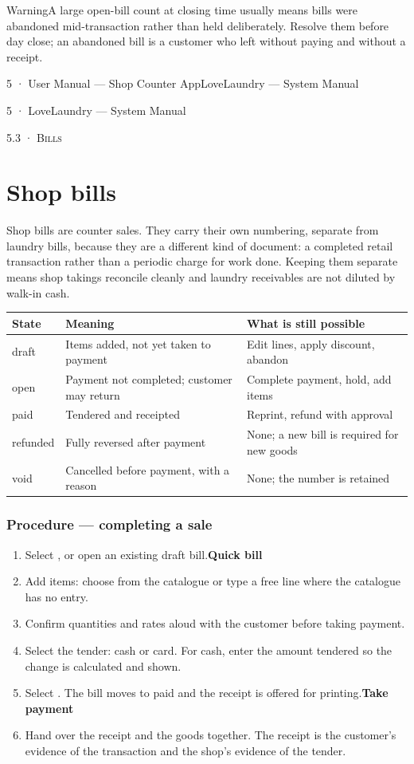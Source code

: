 \documentclass[11pt,a4paper,oneside]{book}
\begin{document}
\begin{notebox}WarningA large open-bill count at closing time usually means bills were abandoned mid-transaction rather than held deliberately. Resolve them before day close; an abandoned bill is a customer who left without paying and without a receipt.\end{notebox}
5 · User Manual — Shop Counter AppLoveLaundry — System Manual

5 · LoveLaundry — System Manual

\textsc{\small\color{crimson}5.3 · Bills}\par\medskip
\section*{Shop bills}
Shop bills are counter sales. They carry their own numbering, separate from laundry bills, because they are a different kind of document: a completed retail transaction rather than a periodic charge for work done. Keeping them separate means shop takings reconcile cleanly and laundry receivables are not diluted by walk-in cash.

\begin{center}\small
\begin{tabularx}{\linewidth}{|X|X|X|}
\hline
\rowcolor{lightgrey}
\textbf{State} & \textbf{Meaning} & \textbf{What is still possible} \\ \hline
draft & Items added, not yet taken to payment & Edit lines, apply discount, abandon \\ \hline
open & Payment not completed; customer may return & Complete payment, hold, add items \\ \hline
paid & Tendered and receipted & Reprint, refund with approval \\ \hline
refunded & Fully reversed after payment & None; a new bill is required for new goods \\ \hline
void & Cancelled before payment, with a reason & None; the number is retained \\ \hline
\end{tabularx}
\end{center}
\subsubsection*{Procedure — completing a sale}
\begin{enumerate}
\item Select , or open an existing draft bill.\textbf{Quick bill}
\item Add items: choose from the catalogue or type a free line where the catalogue has no entry.
\item Confirm quantities and rates aloud with the customer before taking payment.
\item Select the tender: cash or card. For cash, enter the amount tendered so the change is calculated and shown.
\item Select . The bill moves to paid and the receipt is offered for printing.\textbf{Take payment}
\item Hand over the receipt and the goods together. The receipt is the customer's evidence of the transaction and the shop's evidence of the tender.
\end{enumerate}
\end{document}
